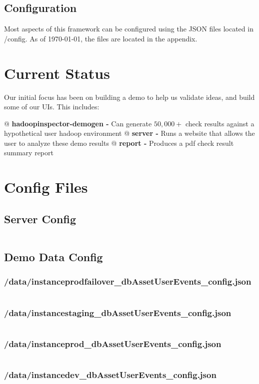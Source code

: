     \subsection{Configuration}
    Most aspects of this framework can be configured using the JSON files located in {\ttfamily /config}. As of \today,
    the files are located in the appendix.

\section{Current Status}
Our initial focus has been on building a demo to help us validate ideas, and build some of our UIs. This includes:

\begin{easylist}[itemize]
    @ \textbf{hadoopinspector-demogen -} Can generate $50,000+$ check results against a hypothetical user hadoop environment
    @ \textbf{server -} Runs a website that allows the user to analyze these demo results
    @ \textbf{report -} Produces a pdf check result summary report
\end{easylist}

\newpage
\appendix

\section{Config Files}

    \subsection{Server Config}
    \inputminted{json}{../config/config.json}

    \subsection{Demo Data Config}

        \subsubsection{/data/instance\-prodfailover\_db\-AssetUserEvents\_config.json}
        \inputminted{json}{../data/instance-prodfailover_db-AssetUserEvents_config.json}

        \subsubsection{/data/instance\-staging\_db\-AssetUserEvents\_config.json}
        \inputminted{json}{../data/instance-staging_db-AssetUserEvents_config.json}

        \subsubsection{/data/instance\-prod\_db\-AssetUserEvents\_config.json}
        \inputminted{json}{../data/instance-prod_db-AssetUserEvents_config.json}

        \subsubsection{/data/instance\-dev\_db\-AssetUserEvents\_config.json}
        \inputminted{json}{../data/instance-dev_db-AssetUserEvents_config.json}
